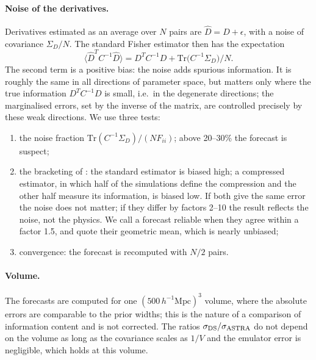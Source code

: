 \documentclass[11pt,twocolumn]{article}
\newcommand{\Mpch}{\,h^{-1}\mathrm{Mpc}}
\begin{document}
\paragraph{Noise of the derivatives.} Derivatives estimated as an average over $N$ pairs are $\hat D = D + \epsilon$, with a noise of covariance $\Sigma_D/N$. The standard Fisher estimator then has the expectation
\begin{equation}
\langle \hat D^T C^{-1}\hat D\rangle = D^T C^{-1} D + \mathrm{Tr}\big(C^{-1}\Sigma_D\big)/N .
\end{equation}
The second term is a positive bias: the noise adds spurious information. It is roughly the same in all directions of parameter space, but matters only where the true information $D^TC^{-1}D$ is small, i.e.\ in the degenerate directions; the marginalised errors, set by the inverse of the matrix, are controlled precisely by these weak directions. We use three tests:
\begin{enumerate}
\item the noise fraction $\mathrm{Tr}(C^{-1}\Sigma_D)/(N F_{ii})$; above 20--30\% the forecast is suspect;
\item the bracketing of \cite{CoultonWandelt2023}: the standard estimator is biased high; a compressed estimator, in which half of the simulations define the compression and the other half measure its information, is biased low. If both give the same error the noise does not matter; if they differ by factors 2--10 the result reflects the noise, not the physics. We call a forecast reliable when they agree within a factor 1.5, and quote their geometric mean, which is nearly unbiased;
\item convergence: the forecast is recomputed with $N/2$ pairs.
\end{enumerate}

\paragraph{Volume.} The forecasts are computed for one $(500\Mpch)^3$ volume, where the absolute errors are comparable to the prior widths; this is the nature of a comparison of information content and is not corrected. The ratios $\sigma_{\rm DS}/\sigma_{\rm ASTRA}$ do not depend on the volume as long as the covariance scales as $1/V$ and the emulator error is negligible, which holds at this volume.
\end{document}
